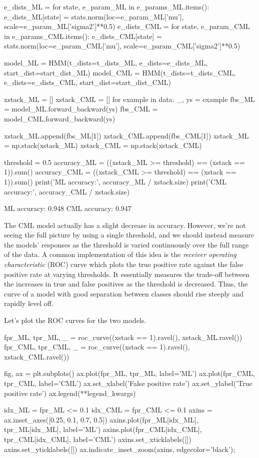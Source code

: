 \begin{NotebookIn}
e_dists_ML = {}
for state, e_param_ML in e_params_ML.items():
    e_dists_ML[state] = stats.norm(loc=e_param_ML['mu'],
                                   scale=e_param_ML['sigma2']**0.5)
e_dists_CML = {}
for state, e_param_CML in e_params_CML.items():
    e_dists_CML[state] = stats.norm(loc=e_param_CML['mu'],
                                    scale=e_param_CML['sigma2']**0.5)

model_ML = HMM(t_dists=t_dists_ML,
               e_dists=e_dists_ML,
               start_dist=start_dist_ML)
model_CML = HMM(t_dists=t_dists_CML,
                e_dists=e_dists_CML,
                start_dist=start_dist_CML)

xstack_ML = []
xstack_CML = []
for example in data:
    _, ys = example
    fbs_ML = model_ML.forward_backward(ys)
    fbs_CML = model_CML.forward_backward(ys)

    xstack_ML.append(fbs_ML[1])
    xstack_CML.append(fbs_CML[1])
xstack_ML = np.stack(xstack_ML)
xstack_CML = np.stack(xstack_CML)

threshold = 0.5
accuracy_ML = ((xstack_ML >= threshold) == (xstack == 1)).sum()
accuracy_CML = ((xstack_CML >= threshold) == (xstack == 1)).sum()
print('ML accuracy:', accuracy_ML / xstack.size)
print('CML accuracy:', accuracy_CML / xstack.size)
\end{NotebookIn}

\begin{NotebookOut}
ML accuracy: 0.948
CML accuracy: 0.947
\end{NotebookOut}

The CML model actually has a slight decrease in accuracy. However, we're not seeing the full picture by using a single threshold, and we should instead measure the models' responses as the threshold is varied continuously over the full range of the data. A common implementation of this idea is the \textit{receiver operating characteristic} (ROC) curve which plots the true positive rate against the false positive rate at varying thresholds. It essentially measures the trade-off between the increases in true and false positives as the threshold is decreased. Thus, the curve of a model with good separation between classes should rise steeply and rapidly level off.

Let's plot the ROC curves for the two models.

\begin{NotebookIn}
fpr_ML, tpr_ML, _ = roc_curve((xstack == 1).ravel(), xstack_ML.ravel())
fpr_CML, tpr_CML, _ = roc_curve((xstack == 1).ravel(), xstack_CML.ravel())

fig, ax = plt.subplots()
ax.plot(fpr_ML, tpr_ML, label='ML')
ax.plot(fpr_CML, tpr_CML, label='CML')
ax.set_xlabel('False positive rate')
ax.set_ylabel('True positive rate')
ax.legend(**legend_kwargs)

idx_ML = fpr_ML <= 0.1
idx_CML = fpr_CML <= 0.1
axins = ax.inset_axes([0.25, 0.1, 0.7, 0.5])
axins.plot(fpr_ML[idx_ML], tpr_ML[idx_ML], label='ML')
axins.plot(fpr_CML[idx_CML], tpr_CML[idx_CML], label='CML')
axins.set_xticklabels([])
axins.set_yticklabels([])
ax.indicate_inset_zoom(axins, edgecolor='black');
\end{NotebookIn}


